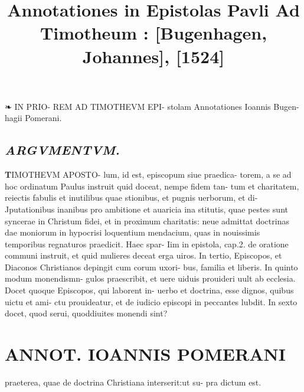 \documentclass{article}
\begin{document}
\date{}
        \title{Annotationes in Epistolas Pavli Ad Timotheum : [Bugenhagen, Johannes], [1524]}
\maketitle
\tableofcontents
\clearpage
\begin{pages} 
\beginnumbering
        ❧ IN PRIO- REM AD TIMOTHEVM EPI- stolam Annotationes Ioannis Bugen- hagii Pomerani. 
{}
\subsection*{\textit{ARGVMENTVM. }}\pstart \huge\textbf{T}\normalsize IMOTHEVM APOSTO- lum, id est, episcopum siue praedica- torem, a se ad hoc ordinatum Paulus instruit quid doceat, nempe fidem tan- tum et charitatem, reiectis fabulis et inutilibus quae stionibus, et pugnis uerborum, et di- Jputationibus inanibus pro ambitione et auaricia ina stitutis, quae pestes sunt syncerae in Christum fidei, et in proximum charitatis: neue admittat doctrinas dae moniorum in hypocrisi loquentium mendacium, quas in nouissimis temporibus regnaturos praedicit. Haec spar- Iim in epistola, cap.2. de oratione communi instruit, et quid mulieres deceat erga uiros. In tertio, Episcopos, et Diaconos Christianos depingit cum corum uxori- bus, familia et liberis. In quinto modum monendismn- gulos praescribit, et uere uiduis prouideri uult ab ecclesia. Docet quoque Episcopos, qui laborent in- uerbo et doctrina, esse dignos, quibus uictu et ami- ctu prouideatur, et de iudicio episcopi in peccantes lubdit. In sexto docet, quod  serui, quoddiuites monendi sint?  \pend
\section*{ANNOT. IOANNIS POMERANI }\pstart praeterea, quae de doctrina Christiana interserit:ut su- pra dictum est.  \pend
{}
{}

\end{pages}
\end{document}
